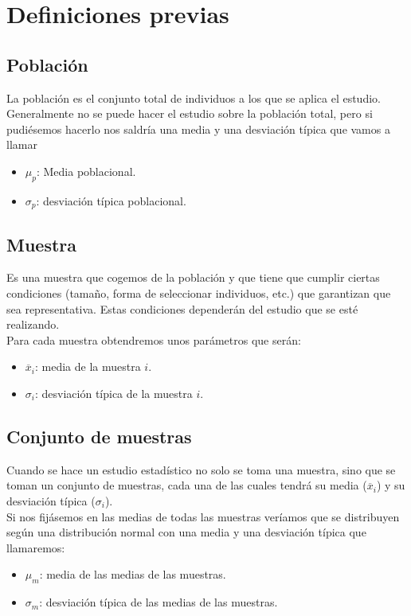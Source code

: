 \documentclass[a4paper,11pt,answers]{exam}
\begin{document}
\section*{Definiciones previas}
\subsection*{Población}
La población es el conjunto total de individuos a los que se aplica el estudio.\\

Generalmente no se puede hacer el estudio sobre la población total, pero si pudiésemos hacerlo nos saldría una media y una desviación típica que vamos a llamar

\begin{itemize}
\Large
\item $\mu_p$: Media poblacional.
\item $\sigma_p$: desviación típica poblacional.
\end{itemize}

\subsection*{Muestra}
Es una muestra que cogemos de la población y que tiene que cumplir ciertas condiciones (tamaño, forma de seleccionar individuos, etc.) que garantizan que sea representativa. Estas condiciones dependerán del estudio que se esté realizando.\\

Para cada muestra obtendremos unos parámetros que serán:
\begin{itemize}
\Large
\item $\overline{x}_i$: media de la muestra $i$.
\item $\sigma_i$: desviación típica de la muestra $i$.
\end{itemize}

\subsection*{Conjunto de muestras}
Cuando se hace un estudio estadístico no solo se toma una muestra, sino que se toman un conjunto de muestras, cada una de las cuales tendrá su media ($\overline{x}_i$) y su desviación típica ($\sigma_i$).\\
Si nos fijásemos en las medias de todas las muestras veríamos que se distribuyen según una distribución normal con una media y una desviación típica que llamaremos:
\begin{itemize}
\Large
\item $\mu_m$: media de las medias de las muestras.
\item $\sigma_m$: desviación típica de las medias de las muestras.
\end{itemize}
\end{document}
